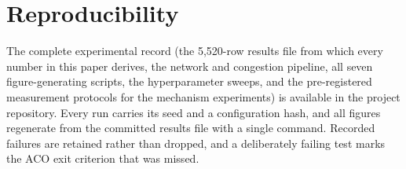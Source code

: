 \section*{Reproducibility}

The complete experimental record (the 5{,}520-row results file from which
every number in this paper derives, the network and congestion pipeline, all
seven figure-generating scripts, the hyperparameter sweeps, and the
pre-registered measurement protocols for the mechanism experiments) is
available in the project repository. Every run carries its seed and a
configuration hash, and all figures regenerate from the committed results
file with a single command. Recorded failures are retained rather than
dropped, and a deliberately failing test marks the ACO exit criterion that
was missed.

